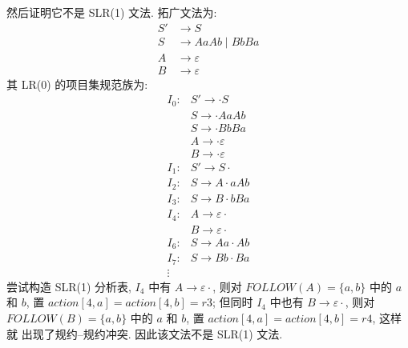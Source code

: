\documentclass[boxes]{homework}
\begin{document}
\begin{solution}
    然后证明它不是 SLR(1) 文法. 拓广文法为:
    \begin{equation}
        \begin{aligned}
            S' & \to S              \\
            S  & \to AaAb \mid BbBa \\
            A  & \to \varepsilon    \\
            B  & \to \varepsilon
        \end{aligned}
    \end{equation}
    其 LR(0) 的项目集规范族为:
    \begin{equation}
        \begin{aligned}
            I_{0} : & S' \to \cdot S           \\
                    & S  \to \cdot AaAb        \\
                    & S  \to \cdot BbBa        \\
                    & A  \to \cdot \varepsilon \\
                    & B  \to \cdot \varepsilon \\
            I_{1} : & S' \to S \cdot           \\
            I_{2} : & S  \to A \cdot aAb       \\
            I_{3} : & S  \to B \cdot bBa       \\
            I_{4} : & A  \to \varepsilon \cdot \\
                    & B  \to \varepsilon \cdot \\
            I_{6} : & S  \to Aa \cdot Ab       \\
            I_{7} : & S  \to Bb \cdot Ba       \\
            \vdots  &
        \end{aligned}
    \end{equation}
    尝试构造 SLR(1) 分析表, $I_{4}$ 中有 $A \to \varepsilon \cdot$, 则对
    $FOLLOW(A) = \{a, b\}$ 中的 $a$ 和 $b$, 置 $action[4, a] = action[4, b] =
        r3$; 但同时 $I_{4}$ 中也有 $B \to \varepsilon \cdot$, 则对 $FOLLOW(B) =
        \{a, b\}$ 中的 $a$ 和 $b$, 置 $action[4, a] = action[4, b] = r4$, 这样就
    出现了规约--规约冲突. 因此该文法不是 SLR(1) 文法.
\end{solution}



\end{document}
